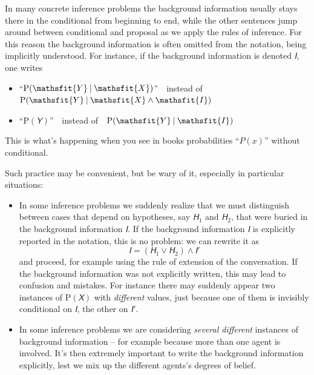 \documentclass[
  a4paper,
  DIV=11,
  numbers=noendperiod,
  oneside]{scrreprt}
\begin{document}
In many concrete inference problems the background information usually
stays there in the conditional from beginning to end, while the other
sentences jump around between conditional and proposal as we apply the
rules of inference. For this reason the background information is often
omitted from the notation, being implicitly understood. For instance, if
the background information is denoted \(\mathsfit{I}\), one writes

\begin{itemize}
\item
  ``\(\mathrm{P}(\mathsfit{Y}\nonscript\:\vert\nonscript\:\mathopen{}\mathsfit{X})\)''~~instead
  of~~\(\mathrm{P}(\mathsfit{Y}\nonscript\:\vert\nonscript\:\mathopen{}\mathsfit{X}\land \mathsfit{I})\)
\item
  ``\(\mathrm{P}(\mathsfit{Y})\)''~~instead
  of~~\(\mathrm{P}(\mathsfit{Y}\nonscript\:\vert\nonscript\:\mathopen{}\mathsfit{I})\)
\end{itemize}

This is what's happening when you see in books probabilities
``\(P(x)\)'' without conditional.

Such practice may be convenient, but be wary of it, especially in
particular situations:

\begin{itemize}
\item
  In some inference problems we suddenly realize that we must
  distinguish between cases that depend on hypotheses, say
  \(\mathsfit{H}_1\) and {\(\mathsfit{H}_2\),} that were buried in the
  background information \(\mathsfit{I}\). If the background information
  \(\mathsfit{I}\) is explicitly reported in the notation, this is no
  problem: we can rewrite it as
  \[ \mathsfit{I}= (\mathsfit{H}_1 \lor \mathsfit{H}_2) \land \mathsfit{I}'\]
  and proceed, for example using the rule of extension of the
  conversation. If the background information was not explicitly
  written, this may lead to confusion and mistakes. For instance there
  may suddenly appear two instances of \(\mathrm{P}(\mathsfit{X})\) with
  \emph{different} values, just because one of them is invisibly
  conditional on \(\mathsfit{I}\), the other on {\(\mathsfit{I}'\).}
\item
  In some inference problems we are considering \emph{several different}
  instances of background information -- for example because more than
  one agent is involved. It's then extremely important to write the
  background information explicitly, lest we mix up the different
  agents's degrees of belief.
\end{itemize}
\end{document}
